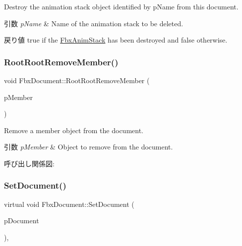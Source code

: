 Destroy the animation stack object identified by p\+Name from this document. 
\begin{DoxyParams}{引数}
{\em p\+Name} & Name of the animation stack to be deleted. \\
\hline
\end{DoxyParams}
\begin{DoxyReturn}{戻り値}
{\ttfamily true} if the \hyperlink{class_fbx_anim_stack}{Fbx\+Anim\+Stack} has been destroyed and {\ttfamily false} otherwise. 
\end{DoxyReturn}
\mbox{\label{class_fbx_document_a7c1703bc0964a016615abf97baf0bc2c}} 
\subsubsection{\texorpdfstring{Root\+Root\+Remove\+Member()}{RootRootRemoveMember()}}
{\footnotesize\ttfamily void Fbx\+Document\+::\+Root\+Root\+Remove\+Member (\begin{DoxyParamCaption}\item[{\hyperlink{class_fbx_object}{Fbx\+Object} $\ast$}]{p\+Member }\end{DoxyParamCaption})}

Remove a member object from the document. 
\begin{DoxyParams}{引数}
{\em p\+Member} & Object to remove from the document. \\
\hline
\end{DoxyParams}
呼び出し関係図\+:
\mbox{\label{class_fbx_document_a063190c324b6fb999b4ac2a1169c2aab}} 
\subsubsection{\texorpdfstring{Set\+Document()}{SetDocument()}}
{\footnotesize\ttfamily virtual void Fbx\+Document\+::\+Set\+Document (\begin{DoxyParamCaption}\item[{\hyperlink{class_fbx_document}{Fbx\+Document} $\ast$}]{p\+Document }\end{DoxyParamCaption})\hspace{0.3cm}{\ttfamily [protected]}, {\ttfamily [virtual]}}



